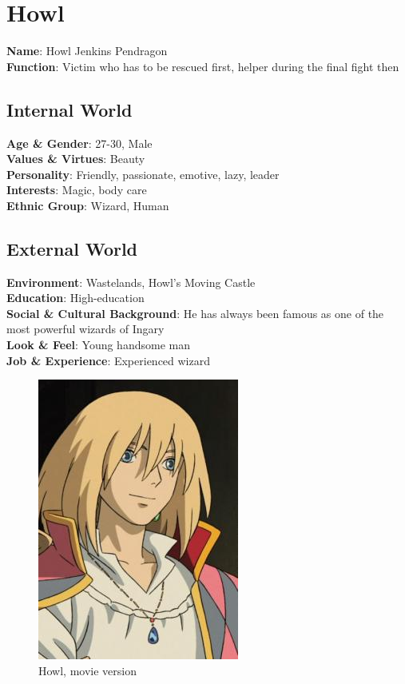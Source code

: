 \section{Howl}

\begin{minipage}{0.5\textwidth}
\textbf{Name}: Howl Jenkins Pendragon \\
\textbf{Function}: Victim who has to be rescued first, helper during the final fight then

\subsection{Internal World}

\textbf{Age \& Gender}: 27-30, Male \\
\textbf{Values \& Virtues}: Beauty \\
\textbf{Personality}: Friendly, passionate, emotive, lazy, leader \\
\textbf{Interests}: Magic, body care \\
\textbf{Ethnic Group}: Wizard, Human

\subsection{External World}
\textbf{Environment}: Wastelands, Howl’s Moving Castle \\
\textbf{Education}: High-education \\
\textbf{Social \& Cultural Background}: He has always been famous as one of the most powerful wizards of Ingary \\
\textbf{Look \& Feel}: Young handsome man   \\
\textbf{Job \& Experience}: Experienced wizard \\

\end{minipage}%
%
\hfill\begin{minipage}{0.4\textwidth}
  \begin{figure}[H]
    \hfill\includegraphics{Images/Characters/howl}
    \caption{Howl, movie version}
  \end{figure}
\end{minipage}


